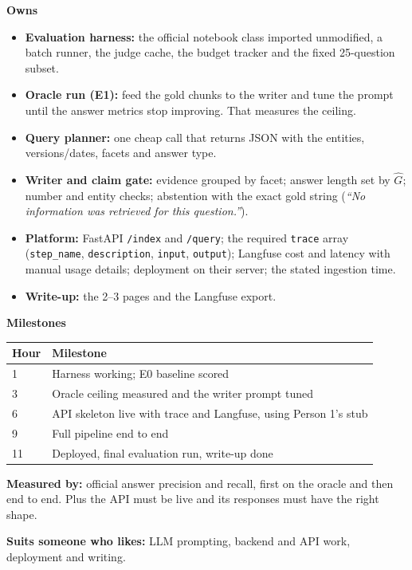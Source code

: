 \documentclass[11pt,a4paper]{article}
\begin{document}
\textbf{Owns}
\begin{itemize}
  \item \textbf{Evaluation harness:} the official notebook class imported unmodified, a batch
        runner, the judge cache, the budget tracker and the fixed 25-question subset.
  \item \textbf{Oracle run (E1):} feed the gold chunks to the writer and tune the prompt until the
        answer metrics stop improving. That measures the ceiling.
  \item \textbf{Query planner:} one cheap call that returns JSON with the entities,
        versions/dates, facets and answer type.
  \item \textbf{Writer and claim gate:} evidence grouped by facet; answer length set by $\hat{G}$;
        number and entity checks; abstention with the exact gold string
        (\emph{``No information was retrieved for this question.''}).
  \item \textbf{Platform:} FastAPI \texttt{/index} and \texttt{/query}; the required
        \texttt{trace} array (\texttt{step\_name}, \texttt{description}, \texttt{input},
        \texttt{output}); Langfuse cost and latency with manual usage details; deployment on
        their server; the stated ingestion time.
  \item \textbf{Write-up:} the 2--3 pages and the Langfuse export.
\end{itemize}

\textbf{Milestones}

\begin{tabularx}{\linewidth}{@{}lX@{}}
\toprule
\textbf{Hour} & \textbf{Milestone} \\
\midrule
1  & Harness working; E0 baseline scored \\
3  & Oracle ceiling measured and the writer prompt tuned \\
6  & API skeleton live with trace and Langfuse, using Person 1's stub \\
9  & Full pipeline end to end \\
11 & Deployed, final evaluation run, write-up done \\
\bottomrule
\end{tabularx}

\textbf{Measured by:} official answer precision and recall, first on the oracle and then end to
end. Plus the API must be live and its responses must have the right shape.

\textbf{Suits someone who likes:} LLM prompting, backend and API work, deployment and writing.
\end{document}
